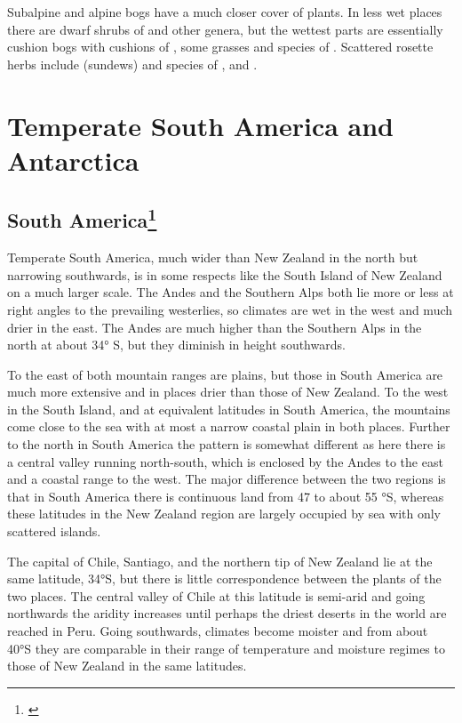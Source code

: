 Subalpine and alpine bogs have a much closer cover of plants.
In less wet places there are dwarf shrubs of  and other genera, but the wettest parts are essentially cushion bogs with cushions of , some grasses and species of .
Scattered rosette herbs include  (sundews) and species of ,  and .

\section{Temperate South America and Antarctica}

\subsection[South America]{South America\footnote{\cite{godley1960botany}}}

Temperate South America, much wider than New Zealand in the north but narrowing southwards, is in some respects like the South Island of New Zealand on a much larger scale.
The Andes and the Southern Alps both lie more or less at right angles to the prevailing westerlies, so climates are wet in the west and much drier in the east.
The Andes are much higher than the Southern Alps in the north at about 34° S, but they diminish in height southwards.

To the east of both mountain ranges are plains, but those in South America are much more extensive and in places drier than those of New Zealand.
To the west in the South Island, and at equivalent latitudes in South America, the mountains come close to the sea with at most a narrow coastal plain in both places.
Further to the north in South America the pattern is somewhat different as here there is a central valley running north-south, which is enclosed by the Andes to the east and a coastal range to the west.
The major difference between the two regions is that in South America there is continuous land from 47 to about 55 °S, whereas these latitudes in the New Zealand region are largely occupied by sea with only scattered islands.

The capital of Chile, Santiago, and the northern tip of New Zealand lie at the same latitude, 34°S, but there is little correspondence between the plants of the two places.
The central valley of Chile at this latitude is semi-arid and going northwards the aridity increases until perhaps the driest deserts in the world are reached in Peru.
Going southwards, climates become moister and from about 40°S they are comparable in their range of temperature and moisture regimes to those of New Zealand in the same latitudes.

